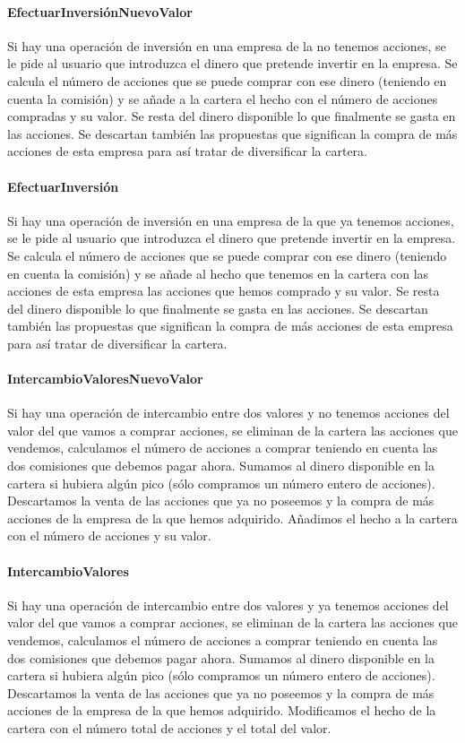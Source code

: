 \documentclass[11pt,leqno]{article}
\theoremstyle{definition_wo_parentheses}
\theoremstyle{plain}
\theoremstyle{remark}
\begin{document}
\paragraph{EfectuarInversiónNuevoValor} Si hay una operación de inversión en una empresa de la no tenemos acciones, se le pide al usuario que introduzca el dinero que pretende invertir en la empresa. Se calcula el número de acciones que se puede comprar con ese dinero (teniendo en cuenta la comisión) y se añade a la cartera el hecho con el número de acciones compradas y su valor. Se resta del dinero disponible lo que finalmente se gasta en las acciones. Se descartan también las propuestas que significan la compra de más acciones de esta empresa para así tratar de diversificar la cartera.

\paragraph{EfectuarInversión} Si hay una operación de inversión en una empresa de la que ya tenemos acciones, se le pide al usuario que introduzca el dinero que pretende invertir en la empresa. Se calcula el número de acciones que se puede comprar con ese dinero (teniendo en cuenta la comisión) y se añade al hecho que tenemos en la cartera con las acciones de esta empresa las acciones que hemos comprado y su valor. Se resta del dinero disponible lo que finalmente se gasta en las acciones. Se descartan también las propuestas que significan la compra de más acciones de esta empresa para así tratar de diversificar la cartera.

\paragraph{IntercambioValoresNuevoValor} Si hay una operación de intercambio entre dos valores y no tenemos acciones del valor del que vamos a comprar acciones, se eliminan de la cartera las acciones que vendemos, calculamos el número de acciones a comprar teniendo en cuenta las dos comisiones que debemos pagar ahora. Sumamos al dinero disponible en la cartera si hubiera algún pico (sólo compramos un número entero de acciones). Descartamos la venta de las acciones que ya no poseemos y la compra de más acciones de la empresa de la que hemos adquirido. Añadimos el hecho a la cartera con el número de acciones y su valor.


\paragraph{IntercambioValores} Si hay una operación de intercambio entre dos valores y ya tenemos acciones del valor del que vamos a comprar acciones, se eliminan de la cartera las acciones que vendemos, calculamos el número de acciones a comprar teniendo en cuenta las dos comisiones que debemos pagar ahora. Sumamos al dinero disponible en la cartera si hubiera algún pico (sólo compramos un número entero de acciones). Descartamos la venta de las acciones que ya no poseemos y la compra de más acciones de la empresa de la que hemos adquirido. Modificamos el hecho de la cartera con el número total de acciones y el total del valor.
\end{document}
